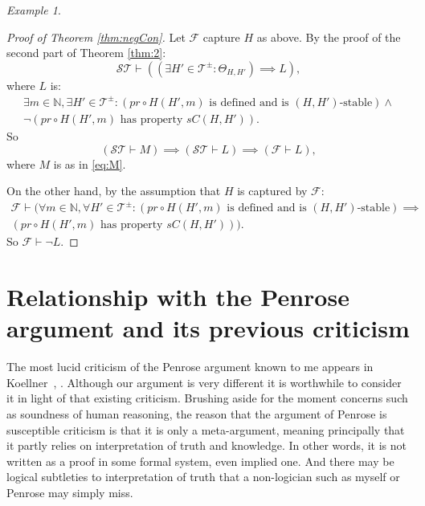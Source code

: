 \documentclass{amsart}  %
\numberwithin{equation}{section}
\theoremstyle{definition}
\theoremstyle{remark}
\newtheorem{example}{Example}
\begin{document}
{\begin{example}
\end{example}
\begin{proof}[Proof of Theorem \ref{thm:negCon}]
 Let $\mathcal{F} $ capture $H$ as above. By the proof of the second part of Theorem \ref{thm:2}:
\begin{equation*}
   \mathcal{ST} \vdash ((\exists H' \in \mathcal{T} ^{\pm}: 
 \Theta _{H, H'})  \implies L),
\end{equation*}
where 
   $L$ is: 
\begin{align*}
\exists m \in \mathbb{N}, \exists H' \in \mathcal{T} ^{\pm}: (pr \circ H    (H',m) \text{ is defined and is $(H,H')$-stable}) \land \\ \neg (pr \circ H (H',m) \text{ has property $sC (H, H' )$}).
\end{align*}
   So
\begin{equation*}
   (\mathcal{ST} \vdash M) \implies (\mathcal{ST} \vdash L) \implies (\mathcal{F} \vdash L),
\end{equation*}
where $M$ is as in \eqref{eq:M}.

On the other hand, by the assumption that $H $ is captured by $\mathcal{F}$:
\begin{align*}
\mathcal{F} \vdash
   (\forall m \in \mathbb{N}, \forall H' \in \mathcal{T} ^{\pm}: (pr \circ H    (H',m) \text{ is defined and is $(H,H')$-stable}) \implies \\ (pr \circ H (H',m) \text{ has property $sC (H, H' )$})).
\end{align*}
So $\mathcal{F} \vdash \neg L$.
\end{proof}
\section{Relationship with the Penrose argument and its previous criticism} \label{section:Penrose}
The most lucid criticism of the Penrose argument known to me appears in Koellner~\cite{citeKoellner2018-KOEOTQ-3}, \cite{citeKoellnerII2018-KOEOTQ-4}. Although our argument is very different it is worthwhile to consider it in light of that existing criticism. Brushing aside for the moment concerns such as soundness of human reasoning, the reason that the argument of Penrose is susceptible criticism is that it is only a meta-argument, meaning principally that it partly relies on interpretation of truth and knowledge. In other words, it is not written as a proof in some formal system, even implied one.  And there may be logical subtleties to interpretation of truth that a non-logician such as myself or Penrose may simply miss. 

}
\end{document}

